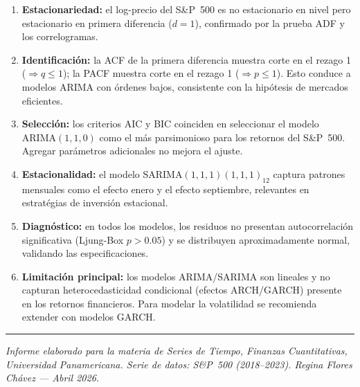 \documentclass[12pt,a4paper]{article}
\begin{document}
\begin{enumerate}[label=\textbf{\arabic*.}]
  \item \textbf{Estacionariedad:} el log-precio del S\&P~500 es no estacionario
    en nivel pero estacionario en primera diferencia ($d=1$), confirmado por la
    prueba ADF y los correlogramas.

  \item \textbf{Identificaci\'{o}n:} la ACF de la primera diferencia muestra corte
    en el rezago 1 ($\Rightarrow q\leq 1$); la PACF muestra corte en el rezago 1
    ($\Rightarrow p\leq 1$). Esto conduce a modelos ARIMA con \'{o}rdenes bajos,
    consistente con la hip\'{o}tesis de mercados eficientes.

  \item \textbf{Selecci\'{o}n:} los criterios AIC y BIC coinciden en seleccionar el
    modelo ARIMA$(1,1,0)$ como el m\'{a}s parsimonioso para los retornos del
    S\&P~500. Agregar par\'{a}metros adicionales no mejora el ajuste.

  \item \textbf{Estacionalidad:} el modelo SARIMA$(1,1,1)(1,1,1)_{12}$ captura
    patrones mensuales como el efecto enero y el efecto septiembre, relevantes
    en estrat\'{e}gias de inversi\'{o}n estacional.

  \item \textbf{Diagn\'{o}stico:} en todos los modelos, los residuos no presentan
    autocorrelaci\'{o}n significativa (Ljung-Box $p > 0.05$) y se distribuyen
    aproximadamente normal, validando las especificaciones.

  \item \textbf{Limitaci\'{o}n principal:} los modelos ARIMA/SARIMA son lineales y
    no capturan heterocedasticidad condicional (efectos ARCH/GARCH) presente en
    los retornos financieros. Para modelar la volatilidad se recomienda extender
    con modelos GARCH.
\end{enumerate}

\vspace{1cm}
\hrule
\vspace{0.4cm}
{\small\textit{Informe elaborado para la materia de Series de Tiempo, Finanzas Cuantitativas,
Universidad Panamericana. Serie de datos: S\&P~500 (2018--2023).
Regina Flores Ch\'{a}vez --- Abril 2026.}}
\end{document}
